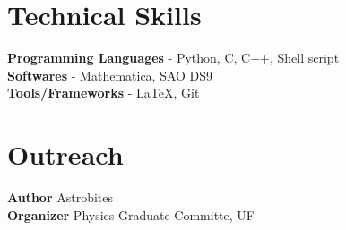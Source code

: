 \documentclass[margin, centered]{res}
\begin{document}
\begin{resume}











\section{Technical \hspace{2mm} Skills}
\textbf{Programming Languages} - Python, C, C++, Shell script\\
\textbf{Softwares} - Mathematica, SAO DS9 \\
\textbf{Tools/Frameworks} - \LaTeX, Git



\section{Outreach}
\textbf{Author}
Astrobites \\

\textbf{Organizer}
Physics Graduate Committe, UF\\



\end{resume}
\end{document}
